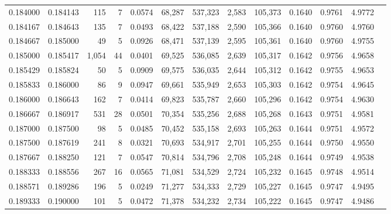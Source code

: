 \begin{tabular}{rrrrrrrrrrrrr}
0.184000 & 0.184143 &   115 &   7 &                                     0.0574 &  68,287 & 537,323 &   2,583 & 105,373 & 0.1640 & 0.9761 & 4.9772 \\
0.184167 & 0.184643 &   135 &   7 &                                     0.0493 &  68,422 & 537,188 &   2,590 & 105,366 & 0.1640 & 0.9760 & 4.9760 \\
0.184667 & 0.185000 &    49 &   5 &                                     0.0926 &  68,471 & 537,139 &   2,595 & 105,361 & 0.1640 & 0.9760 & 4.9755 \\
0.185000 & 0.185417 & 1,054 &  44 &                                     0.0401 &  69,525 & 536,085 &   2,639 & 105,317 & 0.1642 & 0.9756 & 4.9658 \\
0.185429 & 0.185824 &    50 &   5 &                                     0.0909 &  69,575 & 536,035 &   2,644 & 105,312 & 0.1642 & 0.9755 & 4.9653 \\
0.185833 & 0.186000 &    86 &   9 &                                     0.0947 &  69,661 & 535,949 &   2,653 & 105,303 & 0.1642 & 0.9754 & 4.9645 \\
0.186000 & 0.186643 &   162 &   7 &                                     0.0414 &  69,823 & 535,787 &   2,660 & 105,296 & 0.1642 & 0.9754 & 4.9630 \\
0.186667 & 0.186917 &   531 &  28 &                                     0.0501 &  70,354 & 535,256 &   2,688 & 105,268 & 0.1643 & 0.9751 & 4.9581 \\
0.187000 & 0.187500 &    98 &   5 &                                     0.0485 &  70,452 & 535,158 &   2,693 & 105,263 & 0.1644 & 0.9751 & 4.9572 \\
0.187500 & 0.187619 &   241 &   8 &                                     0.0321 &  70,693 & 534,917 &   2,701 & 105,255 & 0.1644 & 0.9750 & 4.9550 \\
0.187667 & 0.188250 &   121 &   7 &                                     0.0547 &  70,814 & 534,796 &   2,708 & 105,248 & 0.1644 & 0.9749 & 4.9538 \\
0.188333 & 0.188556 &   267 &  16 &                                     0.0565 &  71,081 & 534,529 &   2,724 & 105,232 & 0.1645 & 0.9748 & 4.9514 \\
0.188571 & 0.189286 &   196 &   5 &                                     0.0249 &  71,277 & 534,333 &   2,729 & 105,227 & 0.1645 & 0.9747 & 4.9495 \\
0.189333 & 0.190000 &   101 &   5 &                                     0.0472 &  71,378 & 534,232 &   2,734 & 105,222 & 0.1645 & 0.9747 & 4.9486 \\

\end{tabular}
